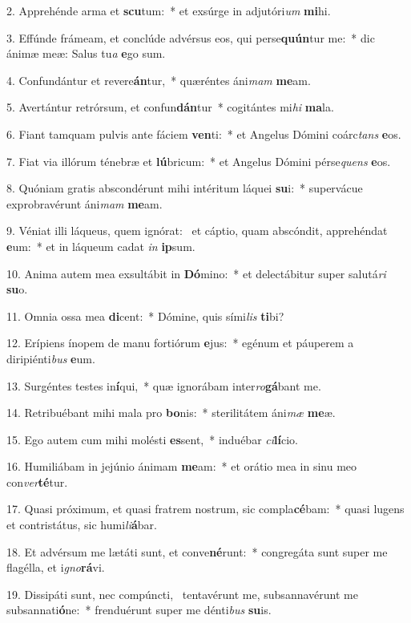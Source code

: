2. Apprehénde arma et \textbf{scu}tum:~*  et exsúrge in adjutóri\textit{um} \textbf{mi}hi.\

3. Effúnde frámeam, et conclúde advérsus eos, qui perse\textbf{quún}tur me:~*  dic ánimæ meæ: Salus tu\textit{a} \textbf{e}go sum.\

4. Confundántur et revere\textbf{án}tur,~*  quæréntes áni\textit{mam} \textbf{me}am.\

5. Avertántur retrórsum, et confun\textbf{dán}tur~*  cogitántes mi\textit{hi} \textbf{ma}la.\

6. Fiant tamquam pulvis ante fáciem \textbf{ven}ti:~*  et Angelus Dómini coárc\textit{tans} \textbf{e}os.\

7. Fiat via illórum ténebræ et \textbf{lú}bricum:~*  et Angelus Dómini pérse\textit{quens} \textbf{e}os.\

8. Quóniam gratis abscondérunt mihi intéritum láquei \textbf{su}i:~*  supervácue exprobravérunt áni\textit{mam} \textbf{me}am.\

9. Véniat illi láqueus, quem ignórat: \dag\  et cáptio, quam abscóndit, apprehéndat \textbf{e}um:~*  et in láqueum cadat \textit{in} \textbf{ip}sum.\

10. Anima autem mea exsultábit in \textbf{Dó}mino:~*  et delectábitur super salutá\textit{ri} \textbf{su}o.\

11. Omnia ossa mea \textbf{di}cent:~*  Dómine, quis sími\textit{lis} \textbf{ti}bi?\

12. Erípiens ínopem de manu fortiórum \textbf{e}jus:~*  egénum et páuperem a diripiénti\textit{bus} \textbf{e}um.\

13. Surgéntes testes in\textbf{í}qui,~*  quæ ignorábam inter\textit{ro}\textbf{gá}bant me.\

14. Retribuébant mihi mala pro \textbf{bo}nis:~*  sterilitátem áni\textit{mæ} \textbf{me}æ.\

15. Ego autem cum mihi molésti \textbf{es}sent,~*  induébar \textit{ci}\textbf{lí}cio.\

16. Humiliábam in jejúnio ánimam \textbf{me}am:~*  et orátio mea in sinu meo con\textit{ver}\textbf{té}tur.\

17. Quasi próximum, et quasi fratrem nostrum, sic compla\textbf{cé}bam:~*  quasi lugens et contristátus, sic humi\textit{li}\textbf{á}bar.\

18. Et advérsum me lætáti sunt, et conve\textbf{né}runt:~*  congregáta sunt super me flagélla, et i\textit{gno}\textbf{rá}vi.\

19. Dissipáti sunt, nec compúncti, \dag\  tentavérunt me, subsannavérunt me subsannati\textbf{ó}ne:~*  frenduérunt super me dénti\textit{bus} \textbf{su}is.\

